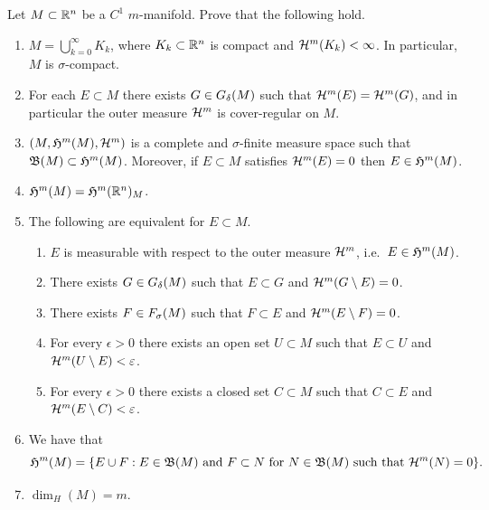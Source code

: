 \documentclass[a4paper]{article}
\begin{document}
\begin{thm}
  Let $M\subset \mathbb{R}^n$ be a $C^1$ $m$-manifold. Prove that the following
  hold.
  \begin{enumerate}
    \item $M = \bigcup_{k=0}^\infty K_k$, where $K_k \subset
            \mathbb{R}^n$ is compact and $\mathcal{H}^m(K_k) < \infty$.
          In particular, $M$ is $\sigma$-compact.

    \item For each $E \subset M$ there exists $G \in G_\delta(M)$ such that
          $\mathcal{H}^m(E) = \mathcal{H}^m(G)$, and in particular the outer measure
          $\mathcal{H}^m$ is cover-regular on $M$.

    \item $(M, \mathfrak{H}^m(M), \mathcal{H}^m)$ is a complete and
          $\sigma$-finite measure space such that $\mathfrak{B} (M)
            \subset \mathfrak{H}^m(M)$. Moreover, if $E \subset M$
          satisfies $\mathcal{H}^m(E) =0$ then $E \in \mathfrak{H}^m(M)$.

    \item $\mathfrak{H}^m(M) = \mathfrak{H}^m(\mathbb{R}^n)_{M}$.

    \item The following are equivalent for $E \subset M$.
          \begin{enumerate}
            \item $E$ is measurable with respect to the outer measure
                  $\mathcal{H}^m$, i.e.\ $E \in \mathfrak{H}^m(M)$.
            \item There exists $G \in G_\delta(M)$ such that $E \subset G$ and
                  $\mathcal{H}^m(G \setminus E) =0$.
            \item There exists $F \in F_\sigma(M)$ such that $F \subset E$ and
                  $\mathcal{H}^m(E \setminus F) =0$.
            \item For every $\epsilon >0$ there exists an open set
                  $U\subset M$ such that $E \subset U$ and $\mathcal{H}^m(U
                  \setminus E) < \varepsilon$.
            \item For every $\epsilon >0$ there exists a closed set
                  $C\subset M$ such that $C \subset E$ and $\mathcal{H}^m(E
                  \setminus C) < \varepsilon$.
          \end{enumerate}

    \item We have that
          \begin{equation*}
            \mathfrak{H}^m(M) = \{ E\cup F : E \in \mathfrak{B} (M) \text{ and } F
            \subset N \text{ for } N \in \mathfrak{B} (M) \text{ such that }
            \mathcal{H}^m(N) = 0 \}.
          \end{equation*}

    \item $\dim_H(M) = m$.
  \end{enumerate}
\end{thm}
\end{document}
